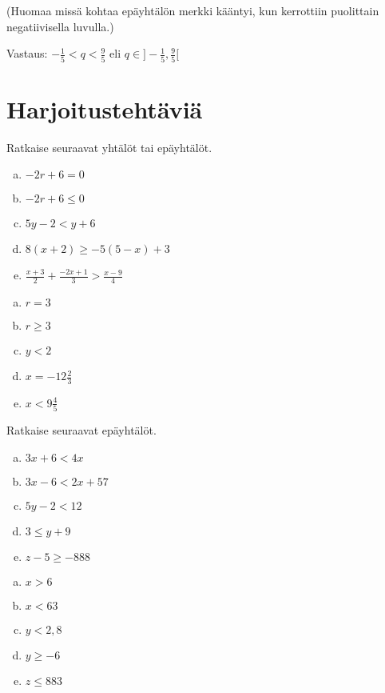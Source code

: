 (Huomaa missä kohtaa epäyhtälön merkki kääntyi, kun kerrottiin puolittain negatiivisella luvulla.)

Vastaus: $-\frac15<q<\frac95$ eli $q\in ]-\frac15,\frac95[$

\section{Harjoitustehtäviä}

\begin{tehtava}
    Ratkaise seuraavat yhtälöt tai epäyhtälöt.
    \begin{enumerate}[a)]
        \item $-2r+6=0$
        \item $-2r+6\leq 0$
        \item $5y-2<y+6$
        \item $8(x+2)\geq -5(5-x)+3$
        \item $\frac{x+3}{2}+\frac{-2x+1}{3}>\frac{x-9}{4}$
    \end{enumerate}
    \begin{vastaus}
        \begin{enumerate}[a)]
            \item $r=3$
            \item $r\geq 3$
            \item $y<2$
            \item $x=-12\frac{2}{3}$
            \item $x<9\frac{4}{5}$
        \end{enumerate}
    \end{vastaus}
\end{tehtava}

\begin{tehtava}
    Ratkaise seuraavat epäyhtälöt.
    \begin{enumerate}[a)]
        \item $3x+6<4x$
        \item $3x-6<2x+57$
        \item $5y-2<12$
        \item $3\leq y+9$
        \item $z-5\geq-888$
    \end{enumerate}
    \begin{vastaus}
        \begin{enumerate}[a)]
            \item $x>6$
            \item $x<63$
            \item $y<2,8$
            \item $y\geq -6$
            \item $z\leq 883$
        \end{enumerate}
    \end{vastaus}
\end{tehtava}


